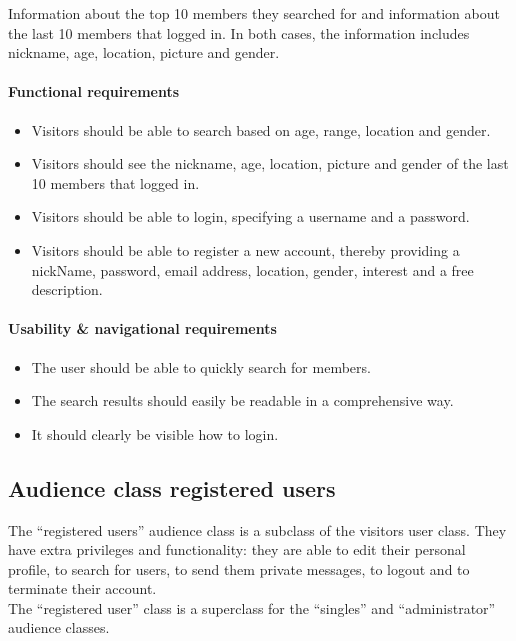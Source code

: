 \documentclass[11pt, a4paper,svglistings,oneside]{book}
\begin{document}
Information about the top 10 members they searched for and information about the last 10 members that logged in. In both cases, the information includes nickname, age, location, picture and gender.

\paragraph{Functional requirements}

\begin{itemize}
\item Visitors should be able to search based on age, range, location and gender.
\item Visitors should see the nickname, age, location, picture and gender of the last 10 members that logged in.
\item Visitors should be able to login, specifying a username and a password.
\item Visitors should be able to register a new account, thereby providing a nickName, password, email address, location, gender, interest and a free description.
\end{itemize}

\paragraph{Usability \& navigational requirements}

\begin{itemize}
\item The user should be able to quickly search for members.
\item The search results should easily be readable in a comprehensive way.
\item It should clearly be visible how to login.
\end{itemize}

\subsection{Audience class registered users}

The ``registered users'' audience class is a subclass of the visitors user class. They have extra privileges and functionality: they are able to edit their personal profile, to search for users, to send them private messages, to logout and to terminate their account. \\
The ``registered user'' class is a superclass for the ``singles'' and ``administrator'' audience classes.
\end{document}
